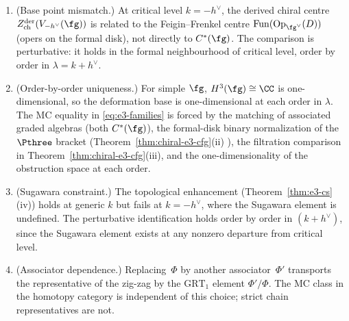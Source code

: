 \begin{theorem}
\begin{enumerate}[label=\textup{(\roman*)}]
 parameter is the departure from critical level;
 for the CFG algebra, it is the Chern--Simons coupling.
\item \textup{(Base point mismatch.)}
 At critical level $k = -h^\vee$, the derived
 chiral centre $Z^{\mathrm{der}}_{\mathrm{ch}}
 (V_{-h^\vee}(\fg))$ is related to the
 Feigin--Frenkel centre
 $\mathrm{Fun}(\mathrm{Op}_{\fg^\vee}(D))$
 \textup{(}opers on the formal disk\textup{)}, not
 directly to $C^*(\fg)$. The comparison is
 perturbative: it holds in the formal neighbourhood
 of critical level, order by order in
 $\lambda = k + h^\vee$.
\item \textup{(Order-by-order uniqueness.)}
 For simple $\fg$, $H^3(\fg) \cong \CC$ is
 one-dimensional, so the deformation base is
 one-dimensional at each order in $\lambda$. The MC equality in
 \eqref{eq:e3-families} is forced by the matching of associated
 graded algebras
 \textup{(}both $C^*(\fg)$\textup{)},
 the formal-disk binary normalization of the $\Pthree$ bracket
 \textup{(}Theorem~\textup{\ref{thm:chiral-e3-cfg}(ii)}%
\textup{)}, the filtration comparison in
Theorem~\textup{\ref{thm:chiral-e3-cfg}(iii)}, and the
one-dimensionality of the obstruction space at each order.
\item \textup{(Sugawara constraint.)}
 The topological enhancement
 \textup{(}Theorem~\ref{thm:e3-cs}(iv)\textup{)} holds
 at generic $k$ but fails at $k = -h^\vee$, where
 the Sugawara element is undefined. The perturbative
 identification holds
 order by order in $(k + h^\vee)$, since the Sugawara
 element exists at any nonzero departure from critical
 level.
\item \textup{(Associator dependence.)}
 Replacing~$\Phi$ by another associator~$\Phi'$ transports the
 representative of the zig-zag by the $\mathrm{GRT}_1$ element
 $\Phi'/\Phi$. The MC class in the homotopy category is independent
 of this choice; strict chain representatives are not.
\end{enumerate}
\end{theorem}

